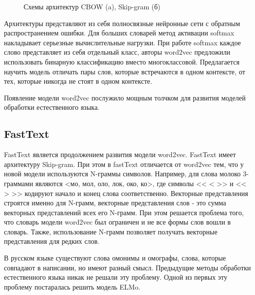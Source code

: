 \documentclass[a4paper,14pt]{article}
\begin{document}
\begin{figure}[H]
\begin{minipage}[h]{0.49\linewidth}
	\end{minipage}
	\caption{Схемы архитектур CBOW (a), Skip-gram (б)}
	\label{fig:word2vec}
\end{figure}

Архитектуры представляют из себя полносвязные нейронные сети с обратным распространением ошибки.
Для больших словарей метод активации softmax накладывает серьезные вычислительные нагрузки.
При работе softmax каждое слово  представляет из себя отдельный класс, авторы word2vec предложили использовать бинарную классификацию вместо многоклассовой.
Предлагается научить модель отличать пары слов, которые встречаются в одном контексте, от тех, которые никогда не стоят в одном контексте.

Появление модели word2vec послужило мощным толчком для развития моделей обработки естественного языка.


\subsection{FastText}

FastText \cite{ft} является продолжением развития модели word2vec.
FastText имеет архитектуру Skip-gram.
При этом в fastText отличается от word2vec тем, что у новой модели используются N-граммы символов.
Например, для слова молоко 3-граммами являются <мо, мол, оло, лок, око, ко>, где символы << < >> и << > >> кодируют начало и конец слова соответственно.
Векторные представления строятся именно для N-грамм, векторные представления слов - это сумма векторных представлений всех его N-грамм.
При этом решается проблема того, что словарь модели word2vec был ограничен и не все формы слов вошли в словарь.
Также, использование N-грамм позволяет получать векторные представления для редких слов.

В русском языке существуют слова омонимы и омографы, слова, которые совпадают в написании, но имеют разный смысл.
Предыдущие методы обработки естественного языка никак не решали эту проблему.
Одной из первых эту проблему постаралась решить модель ELMo.
\end{document}
